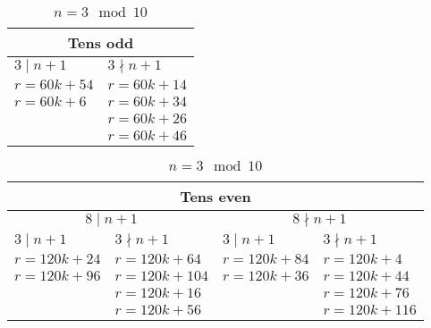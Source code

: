 \documentclass{article}
\begin{document}
\begin{table}[H]
\centering
\caption{$n=3 \mod 10$}
\label{table:21}

\begin{tabular}{|l|l|}
\hline
\multicolumn{2}{|c|}{Tens odd} \\ \hline
$3 \mid n+1$ & $3 \nmid n+1$         \\ \hline
$r=60k+54$ & $r=60k+14$        \\ \hline
$r=60k+6$  & $r=60k+34$        \\ \hline
             & $r=60k+26$       \\ \hline

& $r=60k+46$         \\ \hline
\end{tabular}

\bigskip

\begin{tabular}{|l|l|l|l|}
\hline
\multicolumn{4}{|c|}{Tens even} \\ \hline
\multicolumn{2}{|c|}{$8 \mid n+1$} & \multicolumn{2}{|c|}{$8 \nmid n+1$} \\ \hline
$3 \mid n+1$ & $3 \nmid n+1$  & $3 \mid n+1$ & $3 \nmid n+1$  \\ \hline
$r=120k+24$  & $r=120k+64$ & $r=120k+84$   & $r=120k+4$ \\ \hline
$r=120k+96$  & $r=120k+104$ & $r=120k+36$   & $r=120k+44$ \\ \hline
             & $r=120k+16$ &               & $r=120k+76$ \\ \hline
             & $r=120k+56$ &               & $r=120k+116$  \\ \hline
\end{tabular}
\end{table}
\end{document}
